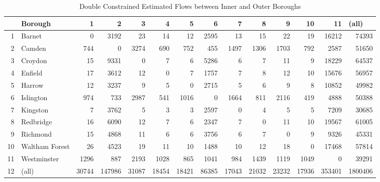 \documentclass[11pt]{article} %
\begin{document}
\begin{table}
\footnotesize
\caption{Double Constrained Estimated Flows between Inner and Outer Boroughs}
\begin{tabular}{|r|l|r|r|r|r|r|r|r|r|r|r|r|r|}
\hline
\multicolumn{1}{|l|}{} & Borough & 1 & 2 & 3 & 4 & 5 & 6 & 7 & 8 & 9 & 10 & 11 & \multicolumn{1}{l|}{(all)} \\ \hline
1 & Barnet & 0 & 3192 & 23 & 14 & 12 & 2595 & 13 & 15 & 22 & 19 & 16212 & 74393 \\ \hline
2 & Camden & 744 & 0 & 3274 & 690 & 752 & 455 & 1497 & 1306 & 1703 & 792 & 2587 & 51650 \\ \hline
3 & Croydon & 15 & 9331 & 0 & 7 & 6 & 5286 & 6 & 7 & 11 & 9 & 18229 & 64537 \\ \hline
4 & Enfield & 17 & 3612 & 12 & 0 & 7 & 1757 & 7 & 8 & 12 & 10 & 15676 & 56957 \\ \hline
5 & Harrow & 12 & 3237 & 9 & 5 & 0 & 2715 & 5 & 6 & 9 & 8 & 10852 & 49982 \\ \hline
6 & Islington & 974 & 733 & 2987 & 541 & 1016 & 0 & 1664 & 811 & 2116 & 419 & 4888 & 50388 \\ \hline
7 & Kingston & 7 & 3762 & 5 & 3 & 3 & 2597 & 0 & 4 & 5 & 5 & 7209 & 30685 \\ \hline
8 & Redbridge & 16 & 6090 & 12 & 7 & 6 & 2347 & 7 & 0 & 11 & 10 & 19567 & 61005 \\ \hline
9 & Richmond & 15 & 4868 & 11 & 6 & 6 & 3756 & 6 & 7 & 0 & 9 & 9326 & 45331 \\ \hline
10 & Waltham Forest & 26 & 4523 & 19 & 11 & 10 & 1488 & 10 & 12 & 18 & 0 & 17468 & 57814 \\ \hline
11 & Westminster & 1296 & 887 & 2193 & 1028 & 865 & 1041 & 984 & 1439 & 1119 & 1049 & 0 & 39291 \\ \hline
12 & (all) & 30744 & 147986 & 31087 & 18454 & 18421 & 86385 & 17043 & 21032 & 23232 & 17936 & 353401 & 1800406 \\ \hline
\end{tabular}
\label{Estimated Flows Double}
\end{table}






%
%
%
\end{document}
